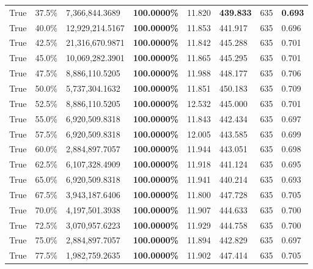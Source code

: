 \begin{table}[H]
\begin{tabular}{lllrllll}
\cline{1-8}
True & 37.5\% & 7,366,844.3689 & \bfseries \color{red} 100.0000\% & 11.820 & \bfseries \color{red} 439.833 & 635 & \bfseries \color{red} 0.693 \\
\cline{1-8}
True & 40.0\% & 12,929,214.5167 & \bfseries \color{red} 100.0000\% & 11.853 & 441.917 & 635 & 0.696 \\
\cline{1-8}
True & 42.5\% & 21,316,670.9871 & \bfseries \color{red} 100.0000\% & 11.842 & 445.288 & 635 & 0.701 \\
\cline{1-8}
True & 45.0\% & 10,069,282.3901 & \bfseries \color{red} 100.0000\% & 11.865 & 445.295 & 635 & 0.701 \\
\cline{1-8}
True & 47.5\% & 8,886,110.5205 & \bfseries \color{red} 100.0000\% & 11.988 & 448.177 & 635 & 0.706 \\
\cline{1-8}
True & 50.0\% & 5,737,304.1632 & \bfseries \color{red} 100.0000\% & 11.851 & 450.183 & 635 & 0.709 \\
\cline{1-8}
True & 52.5\% & 8,886,110.5205 & \bfseries \color{red} 100.0000\% & 12.532 & 445.000 & 635 & 0.701 \\
\cline{1-8}
True & 55.0\% & 6,920,509.8318 & \bfseries \color{red} 100.0000\% & 11.843 & 442.434 & 635 & 0.697 \\
\cline{1-8}
True & 57.5\% & 6,920,509.8318 & \bfseries \color{red} 100.0000\% & 12.005 & 443.585 & 635 & 0.699 \\
\cline{1-8}
True & 60.0\% & 2,884,897.7057 & \bfseries \color{red} 100.0000\% & 11.944 & 443.051 & 635 & 0.698 \\
\cline{1-8}
True & 62.5\% & 6,107,328.4909 & \bfseries \color{red} 100.0000\% & 11.918 & 441.124 & 635 & 0.695 \\
\cline{1-8}
True & 65.0\% & 6,920,509.8318 & \bfseries \color{red} 100.0000\% & 11.941 & 440.214 & 635 & 0.693 \\
\cline{1-8}
True & 67.5\% & 3,943,187.6406 & \bfseries \color{red} 100.0000\% & 11.800 & 447.728 & 635 & 0.705 \\
\cline{1-8}
True & 70.0\% & 4,197,501.3938 & \bfseries \color{red} 100.0000\% & 11.907 & 444.633 & 635 & 0.700 \\
\cline{1-8}
True & 72.5\% & 3,070,957.6223 & \bfseries \color{red} 100.0000\% & 11.929 & 444.758 & 635 & 0.700 \\
\cline{1-8}
True & 75.0\% & 2,884,897.7057 & \bfseries \color{red} 100.0000\% & 11.894 & 442.829 & 635 & 0.697 \\
\cline{1-8}
True & 77.5\% & 1,982,759.2635 & \bfseries \color{red} 100.0000\% & 11.902 & 447.414 & 635 & 0.705 \\

\end{tabular}
\end{table}
